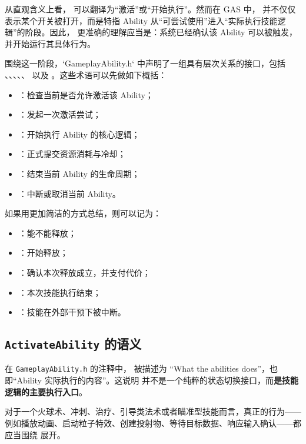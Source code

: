 从直观含义上看， 可以翻译为“激活”或“开始执行”。然而在 GAS 中， 并不仅仅表示某个开关被打开，而是特指 Ability 从“可尝试使用”进入“实际执行技能逻辑”的阶段。因此， 更准确的理解应当是：系统已经确认该 Ability 可以被触发，并开始运行其具体行为。

围绕这一阶段，`GameplayAbility.h` 中声明了一组具有层次关系的接口，包括 、、、、、 以及 。这些术语可以先做如下概括：

\begin{itemize}
	\item {}：检查当前是否允许激活该 Ability；
	\item {}：发起一次激活尝试；
	\item {}：开始执行 Ability 的核心逻辑；
	\item {}：正式提交资源消耗与冷却；
	\item {}：结束当前 Ability 的生命周期；
	\item {}：中断或取消当前 Ability。
\end{itemize}

如果用更加简洁的方式总结，则可以记为：

\begin{itemize}
	\item {}：能不能释放；
	\item {}：开始释放；
	\item {}：确认本次释放成立，并支付代价；
	\item {}：本次技能执行结束；
	\item {}：技能在外部干预下被中断。
\end{itemize}

\subsection{\texttt{ActivateAbility} 的语义}

在 \texttt{GameplayAbility.h} 的注释中， 被描述为 “What the abilities does”，也即“Ability 实际执行的内容”。这说明  并不是一个纯粹的状态切换接口，而\textbf{是技能逻辑的主要执行入口}。

对于一个火球术、冲刺、治疗、引导类法术或者瞄准型技能而言，真正的行为——例如播放动画、启动粒子特效、创建投射物、等待目标数据、响应输入确认——都应当围绕  展开。

